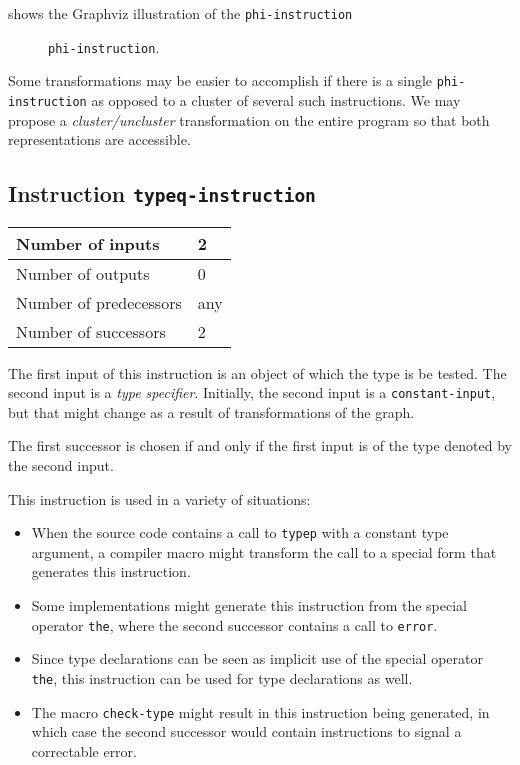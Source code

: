  shows the Graphviz illustration of the
\texttt{phi-instruction}

\begin{figure}
\begin{center}
\end{center}
\caption{\label{fig-phi-instruction}
\texttt{phi-instruction}.}
\end{figure}

Some transformations may be easier to accomplish if there is a single
\texttt{phi-instruction} as opposed to a cluster of several such
instructions.  We may propose a \emph{cluster/uncluster}
transformation on the entire program so that both representations are
accessible. 

\subsection{Instruction \texttt{typeq-instruction}}
\label{mir-instruction-typeq}

\begin{tabular}{|l|l|}
\hline
Number of inputs & 2\\
\hline
Number of outputs & 0\\
\hline
Number of predecessors & any\\
\hline
Number of successors & 2\\
\hline
\end{tabular}

The first input of this instruction is an object of which the type
is be tested.  The second input is a \emph{type specifier}.
Initially, the second input is a \texttt{constant-input}, but that
might change as a result of transformations of the graph.  

The first successor is chosen if and only if the first input is of the
type denoted by the second input. 

This instruction is used in a variety of situations:

\begin{itemize}
\item When the source code contains a call to \texttt{typep} with a
  constant type argument, a compiler macro might transform the call to
  a special form that generates this instruction.
\item Some implementations might generate this instruction from the
  special operator \texttt{the}, where the second successor contains a
  call to \texttt{error}.
\item Since type declarations can be seen as implicit use of the
  special operator \texttt{the}, this instruction can be used for type
  declarations as well.
\item The macro \texttt{check-type} might result in this instruction
  being generated, in which case the second successor would contain
  instructions to signal a correctable error.
\end{itemize}

